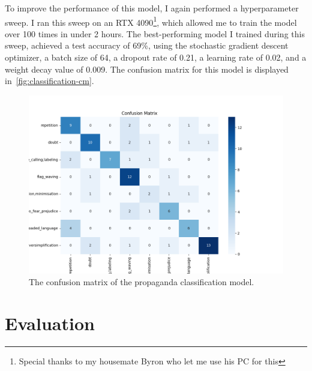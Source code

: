 \documentclass[twocolumn]{article}
\begin{document}
To improve the performance of this model, I again performed a hyperparameter sweep. I ran this sweep on an RTX 4090\footnote{Special thanks to my housemate Byron who let me use his PC for this}, which allowed me to train the model over 100 times in under 2 hours. The best-performing model I trained during this sweep, achieved a test accuracy of 69\%, using the stochastic gradient descent optimizer, a batch size of 64, a dropout rate of 0.21, a learning rate of 0.02, and a weight decay value of 0.009. The confusion matrix for this model is displayed in~\autoref{fig:classification-cm}. 

\begin{figure}
    \centering
    \includegraphics[scale=0.3]{../assets/propaganda-classification-confusion-matrix.png}
    \caption{The confusion matrix of the propaganda classification model.}
    \label{fig:classification-cm}
\end{figure}

\section{Evaluation}


\begingroup
\renewcommand{\arraystretch}{1.15} %
\end{document}
